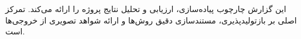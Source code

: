 این گزارش چارچوب پیاده‌سازی، ارزیابی و تحلیل نتایج پروژه را ارائه می‌کند. تمرکز اصلی بر بازتولیدپذیری، مستندسازی دقیق روش‌ها و ارائه شواهد تصویری از خروجی‌ها است.
